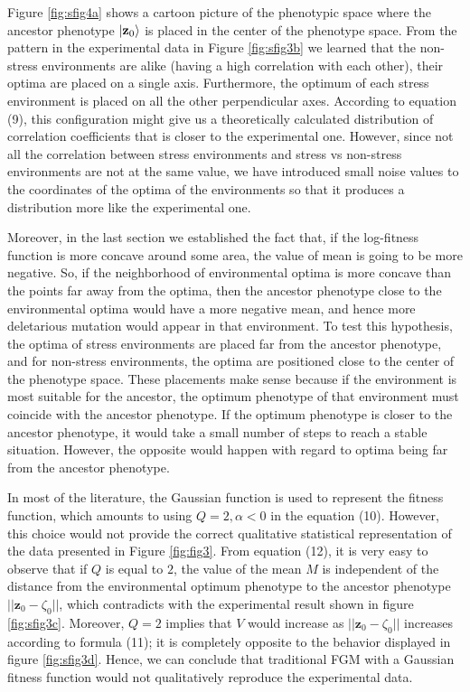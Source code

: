 \documentclass[11pt]{article}
\begin{document}
Figure \ref{fig:sfig4a} shows a cartoon picture of the phenotypic space where the ancestor phenotype $\ket{\mathbf{z}_0}$ is placed in the center of the phenotype space. From the pattern in the experimental data in Figure \ref{fig:sfig3b} we learned that the non-stress environments are alike (having a high correlation with each other), their optima are placed on a single axis. Furthermore, the optimum of each stress environment is placed on all the other perpendicular axes. According to equation (9), this configuration might give us a theoretically calculated distribution of correlation coefficients that is closer to the experimental one. However, since not all the correlation between stress environments and stress vs non-stress environments are not at the same value, we have introduced small noise values to the coordinates of the optima of the environments so that it produces a distribution more like the experimental one.

Moreover, in the last section we established the fact that, if the log-fitness function is more concave around some area, the value of mean is going to be more negative. So, if the neighborhood of environmental optima is more concave than the points far away from the optima, then the ancestor phenotype close to the environmental optima would have a more negative mean, and hence more deletarious mutation would appear in that environment. To test this hypothesis, the optima of stress environments are placed far from the ancestor phenotype, and for non-stress environments, the optima are positioned close to the center of the phenotype space. These placements make sense because if the environment is most suitable for the ancestor, the optimum phenotype of that environment must coincide with the ancestor phenotype. If the optimum phenotype is closer to the ancestor phenotype, it would take a small number of steps to reach a stable situation. However, the opposite would happen with regard to optima being far from the ancestor phenotype.  

In most of the literature, the Gaussian function is used to represent the fitness function, which amounts to using $Q=2, \alpha <0$ in the equation (10). However, this choice would not provide the correct qualitative statistical representation of the data presented in Figure \ref{fig:fig3}. From equation (12), it is very easy to observe that if $Q$ is equal to $2$, the value of the mean $M$ is independent of the distance from the environmental optimum phenotype to the ancestor phenotype $||\mathbf{z}_0 - \zeta_0||$, which contradicts with the experimental result shown in figure \ref{fig:sfig3c}. Moreover, $Q=2$ implies that $V$ would increase as $||\mathbf{z}_0 - \zeta_0||$ increases according to formula (11); it is completely opposite to the behavior displayed in figure \ref{fig:sfig3d}. Hence, we can conclude that traditional FGM with a Gaussian fitness function would not qualitatively reproduce the experimental data. 
\end{document}

